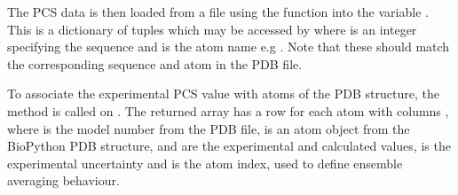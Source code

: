 \documentclass[a4paper,10pt,english,openany,oneside]{sphinxmanual}
\begin{document}
The PCS data is then loaded from a  file using the function {\hyperref[\detokenize{reference/generated/paramagpy.dataparse.read_pcs:paramagpy.dataparse.read_pcs}]{}} into the variable . This is a dictionary of  tuples which may be accessed by  where  is an integer specifying the sequence and  is the atom name e.g . Note that these should match the corresponding sequence and atom in the PDB file.

%
\begin{sphinxVerbatim}[commandchars=\\\{\}]
  
\end{sphinxVerbatim}

To associate the experimental PCS value with atoms of the PDB structure, the method {\hyperref[\detokenize{reference/generated/paramagpy.protein.CustomStructure.parse:paramagpy.protein.CustomStructure.parse}]{}} is called on . The returned array  has a row for each atom with columns , where  is the model number from the PDB file,  is an atom object from the BioPython PDB structure,  and  are the experimental and calculated values,  is the experimental uncertainty and  is the atom index, used to define ensemble averaging behaviour.

%
\begin{sphinxVerbatim}[commandchars=\\\{\}]
  
\end{sphinxVerbatim}
\end{document}
